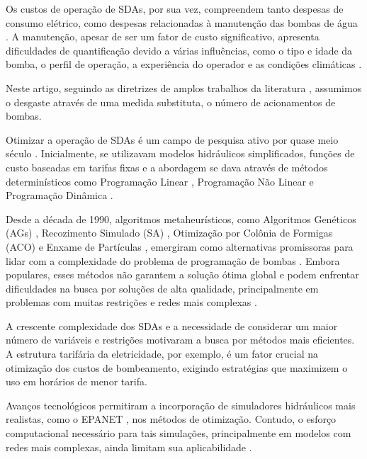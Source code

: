 Os custos de operação de SDAs, por sua vez, compreendem tanto despesas de consumo elétrico, como despesas relacionadas à manutenção das bombas de água \cite{vanZyl2004}. A manutenção, apesar de ser um fator de custo significativo, apresenta dificuldades de quantificação devido a várias influências, como o tipo e idade da bomba, o perfil de operação, a experiência do operador e as condições climáticas \cite{Makaremi2017}.

Neste artigo, seguindo as diretrizes de amplos trabalhos da literatura \cite{lopez2008ant, lansey1994optimal, boulos2001optimal, vanZyl2004, savic1997multiobjective, lopez2005multi, kelner2003optimal, bene2013comparison}, assumimos o desgaste através de uma medida substituta, o número de acionamentos de bombas.

Otimizar a operação de SDAs é um campo de pesquisa ativo por quase meio século \cite{MalaJetmarova2017}. Inicialmente, se utilizavam modelos hidráulicos simplificados, funções de custo baseadas em tarifas fixas \cite{MalaJetmarova2017} e a abordagem se dava através de métodos determinísticos como Programação Linear \cite{jowitt1992optimal}, Programação Não Linear \cite{chase1993computer} e Programação Dinâmica \cite{Nitivattananon1996, sterling1975dynamic, zessler1989optimal}.

Desde a década de 1990, algoritmos metaheurísticos, como Algoritmos Genéticos (AGs) \cite{Mackle1995, vanZyl2004, savic1997multiobjective}, Recozimento Simulado (SA) \cite{goldman1999application,teegavarapu2002optimal}, Otimização por Colônia de Formigas (ACO) \cite{lopez2008ant} e Enxame de Partículas \cite{ostadrahimi2012multi}, emergiram como alternativas promissoras para lidar com a complexidade do problema de programação de bombas \cite{MalaJetmarova2017}. Embora populares, esses métodos não garantem a solução ótima global e podem enfrentar dificuldades na busca por soluções de alta qualidade, principalmente em problemas com muitas restrições e redes mais complexas \cite{Costa2015}.

A crescente complexidade dos SDAs e a necessidade de considerar um maior número de variáveis e restrições motivaram a busca por métodos mais eficientes. A estrutura tarifária da eletricidade, por exemplo, é um fator crucial na otimização dos custos de bombeamento, exigindo estratégias que maximizem o uso em horários de menor tarifa.

Avanços tecnológicos permitiram a incorporação de simuladores hidráulicos mais realistas, como o EPANET \cite{epanet}, nos métodos de otimização. Contudo, o esforço computacional necessário para tais simulações, principalmente em modelos com redes mais complexas, ainda limitam sua aplicabilidade \cite{MalaJetmarova2017}.


